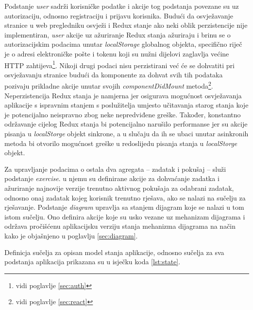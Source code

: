 \documentclass[times, utf8, diplomski, numeric]{fer}
\newcommand{\razmakp}{\vspace{18pt}}
\begin{document}
Podstanje \emph{user} sadrži korisničke podatke i akcije tog podstanja povezane su uz autorizaciju, odnosno registraciju i prijavu korisnika.
Budući da osvježavanje stranice u web pregledniku osvježi i Redux stanje ako neki oblik perzistencije nije implementiran, \emph{user} akcije uz ažuriranje Redux stanja ažuriraju i brinu se o autorizacijskim podacima unutar \emph{localStorage} globalnog objekta, specifično riječ je o adresi elektroničke pošte i tokenu koji su nužni dijelovi zaglavlja većine HTTP zahtijeva\footnote{vidi poglavlje \ref{sec:auth}}.
Nikoji drugi podaci nisu perzistirani već će se dohvatiti pri osvježavanju stranice budući da komponente za dohvat svih tih podataka pozivaju prikladne akcije unutar svojih \emph{componentDidMount} metoda\footnote{vidi poglavlje \ref{sec:react}}.
Neperzistencija Redux stanja je namjerna jer osigurava mogućnost osvježavanja aplikacije s ispravnim stanjem s poslužitelja umjesto učitavanja starog stanja koje je potencijalno neispravno zbog neke nepredviđene greške.
Također, konstantno održavanje cijelog Redux stanja bi potencijalno narušilo performanse jer su akcije pisanja u \emph{localStorge} objekt sinkrone, a u slučaju da ih se ubaci unutar asinkronih metoda bi otvorilo mogućnost greške u redoslijedu pisanja stanja u \emph{localStorge} objekt.

Za upravljanje podacima o ostala dva agregata -- zadatak i pokušaj -- služi podstanje \emph{exercise}.
u njemu su definirane akcije za dohvaćanje zadatka i ažuriranje najnovije verzije trenutno aktivnog pokušaja za odabrani zadatak, odnosno onaj zadatak kojeg korisnik trenutno rješava, ako se nalazi na sučelju za rješavanje.
Podstanje \emph{diagram} upravlja sa stanjem dijagram koje se nalazi u tom istom sučelju.
Ono definira akcije koje su usko vezane uz mehanizam dijagrama i održava pročišćenu aplikacijsku verziju stanja mehanizma dijagrama na način kako je objašnjeno u poglavlju \ref{sec:diagram}.

\razmakp

Definicja sučelja za opisan model stanja aplikacije, odnosno sučelja za sva podstanja aplikacija prikazana su u isječku koda \ref{lst:state}.
\end{document}
